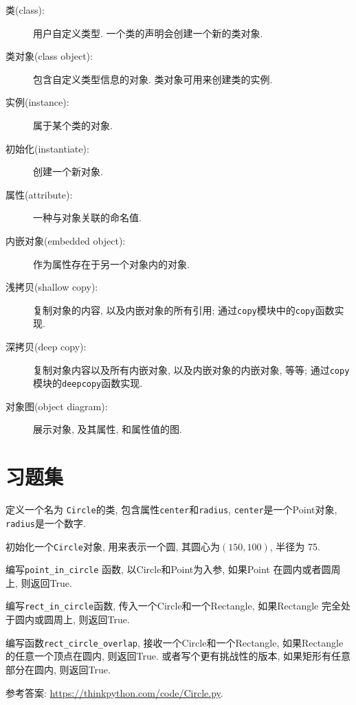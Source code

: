 \documentclass[10pt]{book}
\begin{document}
\begin{description}

\item[类(class):] 用户自定义类型. 一个类的声明会创建一个新的类对象. 

\item[类对象(class object):] 包含自定义类型信息的对象. 
类对象可用来创建类的实例. 

\item[实例(instance):] 属于某个类的对象. 

\item[初始化(instantiate):] 创建一个新对象.

\item[属性(attribute):] 一种与对象关联的命名值. 

\item[内嵌对象(embedded object):] 作为属性存在于另一个对象内的对象. 

\item[浅拷贝(shallow copy):] 复制对象的内容, 以及内嵌对象的所有引用;
通过{\tt copy}模块中的{\tt copy}函数实现. 

\item[深拷贝(deep copy):] 复制对象内容以及所有内嵌对象, 以及内嵌对象的内嵌对象, 等等;
通过{\tt copy} 模块的{\tt deepcopy}函数实现. 

\item[对象图(object diagram):] 展示对象, 及其属性, 和属性值的图. 

\end{description}


\section{习题集}

\begin{exercise}

定义一个名为 {\tt Circle}的类, 包含属性{\tt center}和{\tt radius}, 
 {\tt center}是一个Point对象, {\tt radius}是一个数字. 

初始化一个{\tt Circle}对象, 用来表示一个圆, 其圆心为$(150, 100)$, 
半径为 75.

编写\verb"point_in_circle" 函数, 以Circle和Point为入参, 
如果Point 在圆内或者圆周上, 则返回True. 

编写\verb"rect_in_circle"函数, 传入一个Circle和一个Rectangle, 
如果Rectangle 完全处于圆内或圆周上, 则返回True. 

编写函数\verb"rect_circle_overlap", 接收一个Circle和一个Rectangle, 
如果Rectangle的任意一个顶点在圆内, 则返回True. 
或者写个更有挑战性的版本, 如果矩形有任意部分在圆内, 则返回True. 

参考答案: \url{https://thinkpython.com/code/Circle.py}.

\end{exercise}
\end{document}
